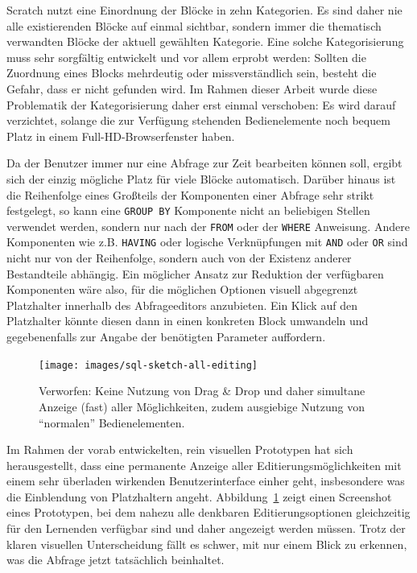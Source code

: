 Scratch nutzt eine Einordnung der Blöcke in zehn Kategorien. Es sind daher nie alle existierenden Blöcke auf einmal sichtbar, sondern immer die thematisch verwandten Blöcke der aktuell gewählten Kategorie. Eine solche Kategorisierung muss sehr sorgfältig entwickelt und vor allem erprobt werden: Sollten die Zuordnung eines Blocks mehrdeutig oder missverständlich sein, besteht die Gefahr, dass er nicht gefunden wird. Im Rahmen dieser Arbeit wurde diese Problematik der Kategorisierung daher erst einmal verschoben: Es wird darauf verzichtet, solange die zur Verfügung stehenden Bedienelemente noch bequem Platz in einem Full-HD-Browserfenster haben.

Da der Benutzer immer nur eine Abfrage zur Zeit bearbeiten können soll, ergibt sich der einzig mögliche Platz für viele Blöcke automatisch. Darüber hinaus ist die Reihenfolge eines Großteils der Komponenten einer Abfrage sehr strikt festgelegt, so kann eine \texttt{GROUP BY} Komponente nicht an beliebigen Stellen verwendet werden, sondern nur nach der \texttt{FROM} oder der \texttt{WHERE} Anweisung. Andere Komponenten wie z.B. \texttt{HAVING} oder logische Verknüpfungen mit \texttt{AND} oder \texttt{OR} sind nicht nur von der Reihenfolge, sondern auch von der Existenz anderer Bestandteile abhängig. Ein möglicher Ansatz zur Reduktion der verfügbaren Komponenten wäre also, für die möglichen Optionen visuell abgegrenzt Platzhalter innerhalb des Abfrageeditors anzubieten. Ein Klick auf den Platzhalter könnte diesen dann in einen konkreten Block umwandeln und gegebenenfalls zur Angabe der benötigten Parameter auffordern.

\begin{figure}[p]
  \centering\texttt{[image: images/sql-sketch-all-editing]}
  \caption{Verworfen: Keine Nutzung von Drag \& Drop und daher simultane Anzeige (fast) aller Möglichkeiten, zudem ausgiebige Nutzung von "`normalen"' Bedienelementen.}
  \label{fig:screen-sql-editor-all-editing}
\end{figure}

Im Rahmen der vorab entwickelten, rein visuellen Prototypen hat sich herausgestellt, dass eine permanente Anzeige aller Editierungsmöglichkeiten mit einem sehr überladen wirkenden Benutzerinterface einher geht, insbesondere was die Einblendung von Platzhaltern angeht. Abbildung~\ref{fig:screen-sql-editor-all-editing} zeigt einen Screenshot eines Prototypen, bei dem nahezu alle denkbaren Editierungsoptionen gleichzeitig für den Lernenden verfügbar sind und daher angezeigt werden müssen. Trotz der klaren visuellen Unterscheidung fällt es schwer, mit nur einem Blick zu erkennen, was die Abfrage jetzt tatsächlich beinhaltet.

